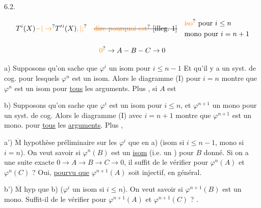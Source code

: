\uline{} 6.2. \unsure{----|\ldots}

\[
T^i(X)\unsure{\mathord{-}|\to}T'{}^i(X)\unsure{,|;}
\quad \deleted{\text{\unsure{dire pourquoi est} \illegible{1}}}
\quad\begin{aligned}&\text{\unsure{iso} pour }i\le n\\
&\text{mono pour }i=n+1\end{aligned}
\]

\[
\unsure{0}\to A-B-C\to 0
\]


a) Supposons qu'on sache que $\varphi^i$ un isom pour $i\le n-1$  Et qu'il y a un syst. de cog. pour lesquels  $\varphi^n$ est un isom. Alors le diagramme (I) pour $i=n$ montre que  $\varphi^n$ est un isom pour \uline{tous} les  arguments. Plus , si $A$ est 

b) Supposons qu'on sache que $\varphi^i$ est un isom pour $i\le n$, et $\varphi^{n+1}$ un mono pour un syst. de cog. Alors le diagramme (I) avec $i=n+1$ montre que $\varphi^{n+1}$ est un mono. pour \uline{tous} les \uline{arguments}. Plus , 

a') $\overline{\mathrm M}$ hypothèse préliminaire sur les $\varphi^i$ que en a) (isom si $i\le n-1$, mono si $i=n$). On veut savoir si $\varphi^n(B)$ est un \uline{isom} (i.e. un ) pour $B$ donné. Si on a une suite exacte $0\to A\to B\to C\to 0$, il suffit de le vérifier pour $\varphi^n(A)$ et $\varphi^n(C)$ ? Oui, \uline{pourvu que} $\varphi^{n+1}(A)$ soit injectif,  en général.

b') $\overline{\mathrm M}$ hyp  que b) ($\varphi^i$ un isom si $i\le n$). On veut savoir si $\varphi^{n+1}(B)$ est un mono. Suffit-il de le vérifier pour $\varphi^{n+1}(A)$ et $\varphi^{n+1}(C)$ ? .

